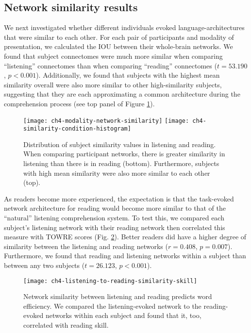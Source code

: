 \subsection{Network similarity results}

We next investigated whether different individuals evoked language-architectures that were similar to each other. For each pair of participants and modality of presentation, we calculated the IOU between their whole-brain networks. We found that subject connectomes were much more similar when comparing ``listening'' connectomes than when comparing ``reading'' connectomes ($t = 53.190$, $p < 0.001$). Additionally, we found that subjects with the highest mean similarity overall were also more similar to other high-similarity subjects, suggesting that they are each approximating a common architecture during the comprehension process (see top panel of Figure \ref{fig:ch4-modality-network-similarity}).

\begin{figure}[t!]
	\centering
	\texttt{[image: ch4-modality-network-similarity]}
	\texttt{[image: ch4-similarity-condition-histogram]}
    \caption[Network similarity across subjects in listening and reading.] {Distribution of subject similarity values in listening and reading. When comparing participant networks, there is greater similarity in listening than there is in reading (bottom). Furthermore, subjects with high mean similarity were also more similar to each other (top).}
	\label{fig:ch4-modality-network-similarity}
\end{figure}

As readers become more experienced, the expectation is that the task-evoked network architecture for reading would become more similar to that of the ``natural'' listening comprehension system. To test this, we compared each subject's listening network with their reading network then correlated this measure with TOWRE scores (Fig. \ref{fig:ch4-modality-similarity-to-reading}). Better readers did have a higher degree of similarity between the listening and reading networks ($r = 0.408$, $p = 0.007$). Furthermore, we found that reading and listening networks within a subject than between any two subjects ($t = 26.123$, $p < 0.001$). 

\begin{figure}[t!]
	\centering
	\texttt{[image: ch4-listening-to-reading-similarity-skill]}
    \caption[Network similarity between listening and reading predicts word efficiency]{Network similarity between listening and reading predicts word efficiency. We compared the listening-evoked network to the reading-evoked networks within each subject and found that it, too, correlated with reading skill.}
	\label{fig:ch4-modality-similarity-to-reading}
\end{figure}

